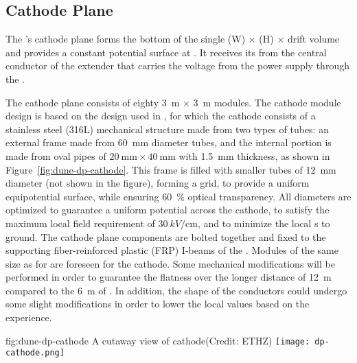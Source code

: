 \subsection{Cathode Plane}

The \dpmod{}'s cathode plane forms the  bottom of the single 
\dptpcwdth (W) $\times$ \tpcheight (H) $\times$ \dptpclen
drift volume and provides a constant potential surface at \dptargetdriftvoltneg{}.  It receives its  from the central conductor of the extender that carries the voltage from the power supply through the  \fdth.  

The cathode plane consists of eighty \SI{3}{\m} $\times$ \SI{3}{\m} modules. 
The cathode module design is based on the design used in  , for which the cathode consists of a stainless steel (316L) mechanical structure 
made from two types of tubes: 
an external frame made from \SI{60}{\milli\m} diameter tubes, and the internal portion is made from oval pipes of $\SI{20}{\milli\m}\times \SI{40}{\milli\m}$ with \SI{1.5}{mm} thickness, as shown in Figure~\ref{fig:dune-dp-cathode}. 
This frame is filled with smaller tubes of \SI{12}{\milli\m} diameter (not shown in the figure), forming a grid, to provide a uniform equipotential surface, while ensuring \SI{60}{\%} optical transparency. All diameters are optimized to guarantee a uniform potential across the cathode, to satisfy the maximum local field requirement of $\SI{30}{kV/\centi\m}$, and to minimize the local \efield{}s to ground. 
The cathode plane components are bolted together and fixed to the supporting  fiber-reinforced plastic (FRP) I-beams of the . 
%
Modules of the same size as for  are foreseen for the \dpmod{} cathode. Some mechanical modifications will be performed in order to guarantee the flatness over the longer distance of  \SI{12}{\m} compared to the  \SI{6}{\m} of  .  In addition, the shape of the conductors could undergo some slight modifications in order to lower the local \efield values based on the  experience.

\begin{dunefigure}{fig:dune-dp-cathode}
{A cutaway view of  cathode(Credit: ETHZ)}
\texttt{[image: dp-cathode.png]}
\end{dunefigure}

